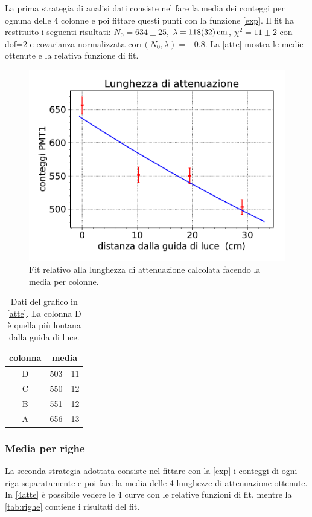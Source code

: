 La prima strategia di analisi dati consiste nel fare la media dei conteggi per ognuna delle 4 colonne e poi fittare questi punti con la funzione \eqref{exp}.
Il fit ha restituito i seguenti risultati: $N_0=634\pm25$,  $\lambda=\SI{118\pm32}{cm}$, $\chi^2=11\pm2$ con dof=2 e covarianza normalizzata corr$(N_0,\lambda)=-0.8$. 
La \autoref{atte} mostra le medie ottenute e la relativa funzione di fit.
\begin{figure}[h]
\centering
\includegraphics[width=8 cm]{atte}
\caption{Fit relativo alla lunghezza di attenuazione calcolata facendo la media per colonne.}
\label{atte}
\end{figure}

\begin{table}[h]
\centering
\begin{tabular}{| c | r @{$\pm$} l |}
\hline
colonna & \multicolumn{2}{c|}{media} \\
\hline
D & 503&11 \\
C & 550&12 \\
B & 551&12 \\
A & 656&13 \\
\hline
\end{tabular}
\caption{Dati del grafico in \autoref{atte}. La colonna D è quella più lontana dalla guida di luce.}
\end{table}

\subsubsection{Media per righe}

La seconda strategia adottata consiste nel fittare con la \eqref{exp} i conteggi di ogni riga separatamente e poi fare la media delle 4 lunghezze di attenuazione ottenute.
In \autoref{4atte} è possibile vedere le 4 curve con le relative funzioni di fit, mentre la \autoref{tab:righe} contiene i risultati del fit.

